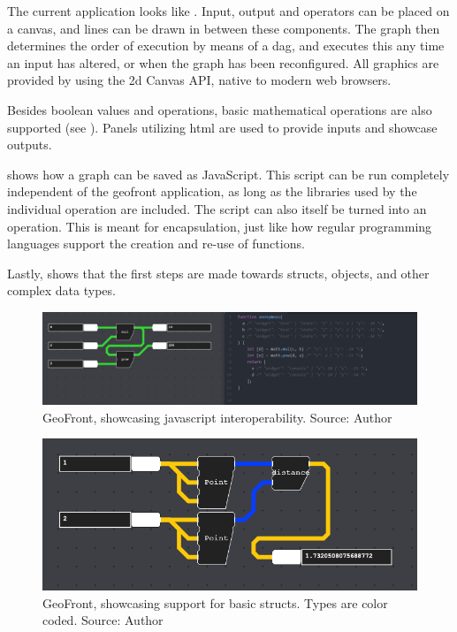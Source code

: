 The current application looks like . Input, output and operators can be placed on a canvas, and lines can be drawn in between these components. The graph then determines the order of execution by means of a \ac{dag}, and executes this any time an input has altered, or when the graph has been reconfigured. All graphics are provided by using the 2d Canvas API, native to modern web browsers.

Besides boolean values and operations, basic mathematical operations are also supported (see ). Panels utilizing html are used to provide inputs and showcase outputs. 

 shows how a graph can be saved as JavaScript. This script can be run completely independent of the geofront application, as long as the libraries used by the individual operation are included. The script can also itself be turned into an operation. This is meant for encapsulation, just like how regular programming languages support the creation and re-use of functions.

Lastly,  shows that the first steps are made towards structs, objects, and other complex data types. 

\begin{figure}[!tbp]
  \centering
  \begin{minipage}[b]{1.0\textwidth}
    \includegraphics[width=\textwidth]{../images/geofront-3.PNG}
    \caption{GeoFront, showcasing javascript interoperability. Source: Author}
    \label{fig:geofront-3}
  \end{minipage}
\end{figure}

\begin{figure}[!tbp]
  \centering
  \begin{minipage}[b]{1.0\textwidth}
    \includegraphics[width=\textwidth]{../images/geofront-4.PNG}
    \caption{GeoFront, showcasing support for basic structs. Types are color coded. Source: Author}
    \label{fig:geofront-4}
  \end{minipage}
\end{figure}